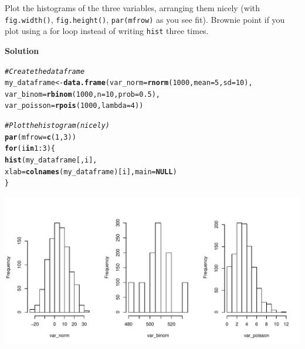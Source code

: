 \documentclass{article}\usepackage[]{graphicx}\usepackage[]{color}
\makeatletter
\def\maxwidth{ %
  \ifdim\Gin@nat@width>\linewidth
    \linewidth
  \else
    \Gin@nat@width
  \fi
}
\newcommand{\hlnum}[1]{\textcolor[rgb]{0.686,0.059,0.569}{#1}}%
\newcommand{\hlcom}[1]{\textcolor[rgb]{0.678,0.584,0.686}{\textit{#1}}}%
\newcommand{\hlopt}[1]{\textcolor[rgb]{0,0,0}{#1}}%
\newcommand{\hlstd}[1]{\textcolor[rgb]{0.345,0.345,0.345}{#1}}%
\newcommand{\hlkwa}[1]{\textcolor[rgb]{0.161,0.373,0.58}{\textbf{#1}}}%
\newcommand{\hlkwb}[1]{\textcolor[rgb]{0.69,0.353,0.396}{#1}}%
\newcommand{\hlkwc}[1]{\textcolor[rgb]{0.333,0.667,0.333}{#1}}%
\newcommand{\hlkwd}[1]{\textcolor[rgb]{0.737,0.353,0.396}{\textbf{#1}}}%
\newenvironment{kframe}{%
 \def\at@end@of@kframe{}%
 \ifinner\ifhmode%
  \def\at@end@of@kframe{\end{minipage}}%
  \begin{minipage}{\columnwidth}%
 \fi\fi%
 \def\FrameCommand##1{\hskip\@totalleftmargin \hskip-\fboxsep
 \colorbox{shadecolor}{##1}\hskip-\fboxsep
     \hskip-\linewidth \hskip-\@totalleftmargin \hskip\columnwidth}%
 \MakeFramed {\advance\hsize-\width
   \@totalleftmargin\z@ \linewidth\hsize
   \@setminipage}}%
 {\par\unskip\endMakeFramed%
 \at@end@of@kframe}
\newenvironment{knitrout}{}{} %
\makeatother
\begin{document}
Plot the histograms of the three variables, arranging them nicely (with \verb`fig.width()`, \verb`fig.height()`, \verb`par(mfrow)` as you see fit). Brownie point if you plot using a for loop instead of writing \verb`hist` three times.

\textbf{Solution}

\begin{knitrout}
\color{fgcolor}\begin{kframe}
\begin{alltt}
\hlcom{# Create the data frame}
\hlstd{my_dataframe} \hlkwb{<-} \hlkwd{data.frame}\hlstd{(}\hlkwc{var_norm} \hlstd{=} \hlkwd{rnorm}\hlstd{(}\hlnum{1000}\hlstd{,} \hlkwc{mean} \hlstd{=} \hlnum{5}\hlstd{,} \hlkwc{sd} \hlstd{=} \hlnum{10}\hlstd{),}
                           \hlkwc{var_binom} \hlstd{=} \hlkwd{rbinom}\hlstd{(}\hlnum{1000}\hlstd{,} \hlkwc{n} \hlstd{=} \hlnum{10}\hlstd{,} \hlkwc{prob} \hlstd{=} \hlnum{0.5}\hlstd{),}
                           \hlkwc{var_poisson} \hlstd{=} \hlkwd{rpois}\hlstd{(}\hlnum{1000}\hlstd{,} \hlkwc{lambda} \hlstd{=} \hlnum{4}\hlstd{))}
\end{alltt}
\end{kframe}
\end{knitrout}

\begin{knitrout}
\color{fgcolor}\begin{kframe}
\begin{alltt}
\hlcom{# Plot the histogram (nicely)}
\hlkwd{par}\hlstd{(}\hlkwc{mfrow} \hlstd{=} \hlkwd{c}\hlstd{(}\hlnum{1}\hlstd{,} \hlnum{3}\hlstd{))}
\hlkwa{for} \hlstd{(i} \hlkwa{in} \hlnum{1}\hlopt{:}\hlnum{3}\hlstd{) \{}
  \hlkwd{hist}\hlstd{(my_dataframe[ , i],}
       \hlkwc{xlab} \hlstd{=} \hlkwd{colnames}\hlstd{(my_dataframe)[i],} \hlkwc{main} \hlstd{=} \hlkwa{NULL}\hlstd{)}
\hlstd{\}}
\end{alltt}
\end{kframe}
\includegraphics[width=\maxwidth]{figure/unnamed-chunk-2-1} 

\end{knitrout}
\end{document}
